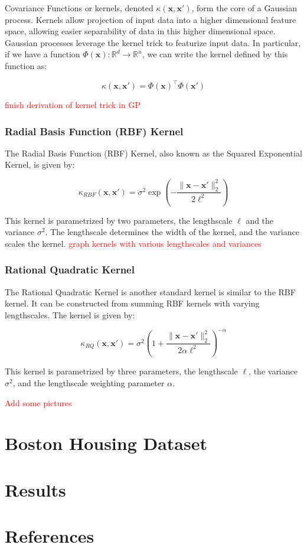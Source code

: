\documentclass{article}
\newcommand{\R}{\mathbb{R}}
\newcommand{\bx}{\boldsymbol{x}}
\newcommand{\todo}[1]{\textcolor{red}{#1}}
\begin{document}
Covariance Functions or kernels, denoted $\kappa(\bx, \bx')$, form the core of a Gaussian process. Kernels allow
projection of input data into a higher dimensional feature space, allowing easier separability of data in this higher
dimensional space. Gaussian processes leverage the kernel trick to featurize input data. In particular, if we have a
function $\Phi(\bx): \R^d \rightarrow \R^n$, we can write the kernel defined by this function as:

\[
  \kappa(\bx, \bx') = \Phi(\bx)^\top \Phi(\bx')
\]

\todo{finish derivation of kernel trick in GP}

\subsubsection{Radial Basis Function (RBF) Kernel}

The Radial Basis Function (RBF) Kernel, also known as the Squared Exponential Kernel, is given by:

\[
  \kappa_{RBF}(\bx, \bx') = \sigma^2 \exp\left( - \frac{\|\bx -\bx' \|_{2}^{2}}{2 \ell^2} \right)
\]

This kernel is parametrized by two parameters, the lengthscale $\ell$ and the variance $\sigma^2$. The lengthscale
determines the width of the kernel, and the variance scales the kernel\cite{duvenaud_automatic_2014}. \todo{graph
kernels with various lengthscales and variances}

\subsubsection{Rational Quadratic Kernel}

The Rational Quadratic Kernel is another standard kernel is similar to the RBF kernel. It can be constructed from
summing RBF kernels with varying lengthscales. The kernel is given by:

\[
  \kappa_{RQ}(\bx, \bx') = \sigma^2 \left( 1 + \frac{\| \bx - \bx' \|_{2}^{2}}{2 \alpha \ell^2} \right)^{-\alpha}
\]

This kernel is parametrized by three parameters, the lengthscale $\ell$, the variance $\sigma^2$, and the lengthscale
weighting parameter $\alpha$\cite{duvenaud_automatic_2014}.

\todo{Add some pictures}

\section{Boston Housing Dataset}

\section{Results}

\section*{References}

\medskip

\small


\end{document}
